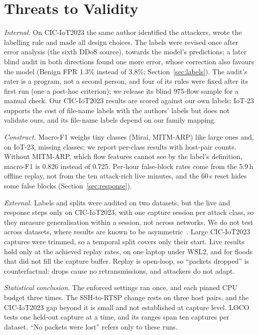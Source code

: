 \section{Threats to Validity}\label{sec:threats}

\emph{Internal.} On CIC-IoT2023 the same author identified the attackers, wrote the labelling rule and made all design choices. The labels were revised once after error analysis (the sixth DDoS source), towards the model's predictions; a later blind audit in both directions found one more error, whose correction also favours the model (Benign FPR 1.3\% instead of 3.8\%; Section~\ref{sec:labels}). The audit's rater is a program, not a second person, and four of its rules were fixed after its first run (one a post-hoc criterion); we release its blind 975-flow sample for a manual check. Our CIC-IoT2023 results are scored against our own labels; IoT-23 supports the cost of file-name labels with the authors' labels but does not validate ours, and its file-name labels depend on our family mapping.

\emph{Construct.} Macro-F1 weighs tiny classes (Mirai, MITM-ARP) like large ones and, on IoT-23, missing classes; we report per-class results with host-pair counts. Without MITM-ARP, which flow features cannot see by the label's definition, macro-F1 is 0.826 instead of 0.725. Per-hour false-block rates come from the 5.9\,h offline replay, not from the ten attack-rich live minutes, and the 60\,s reset hides some false blocks (Section~\ref{sec:response}).

\emph{External.} Labels and splits were audited on two datasets, but the live and response steps only on CIC-IoT2023, with one capture session per attack class, so they measure generalisation within a session, not across networks. We do not test across datasets, where results are known to be asymmetric~\cite{ali2026siamxbert}. Large CIC-IoT2023 captures were trimmed, so a temporal split covers only their start. Live results hold only at the achieved replay rates, on one laptop under WSL2, and for floods that did not fill the capture buffer. Replay is open-loop, so ``packets dropped'' is counterfactual: drops cause no retransmissions, and attackers do not adapt.

\emph{Statistical conclusion.} The enforced settings ran once, and each pinned CPU budget three times. The SSH-to-RTSP change rests on three host pairs, and the CIC-IoT2023 gap beyond it is small and not established at capture level. LOCO tests one held-out capture at a time, and its ranges span ten captures per dataset. ``No packets were lost'' refers only to these runs.


